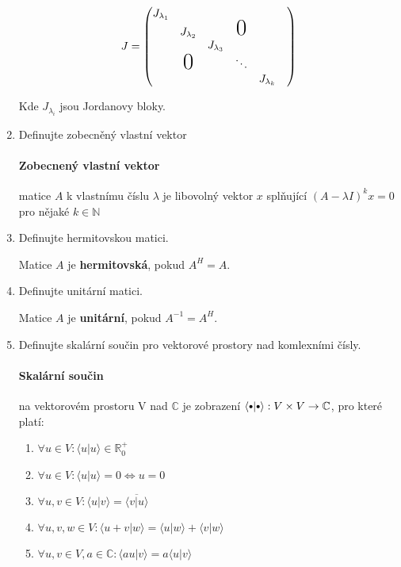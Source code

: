 \documentclass[10pt,a4paper]{article}
\newcommand\sbullet[1][.5]{\mathbin{\vcenter{\hbox{\scalebox{#1}{$\bullet$}}}}}
\theoremstyle{plain}
\begin{document}
\begin{enumerate}
\[ J = \begin{pmatrix}
J_{\lambda_1} && 	&&\\
& J_{\lambda_2} &&\mbox{\huge{0}} &\\
&& J_{\lambda_3}&&&\\
&\mbox{\huge{0}}&& \ddots & \\
& &	&& J_{\lambda_k}
\end{pmatrix}\]

Kde $J_{\lambda_i}$ jsou Jordanovy bloky.

\item Definujte zobecněný vlastní vektor

\paragraph{Zobecnený vlastní vektor} matice $A$ k vlastnímu číslu $\lambda$ je libovolný vektor $x$ splňující $(A-\lambda I)^kx = 0$ pro nějaké $k \in \mathbb{N}$ 

\item Definujte hermitovskou matici.

Matice $A$ je \textbf{hermitovská}, pokud $A^H = A$.

\item Definujte unitární matici.


Matice $A$ je \textbf{unitární}, pokud $A^{-1} = A^H$.


\item Definujte skalární součin pro vektorové prostory nad komlexními čísly.

\paragraph{Skalární součin} na vektorovém prostoru V nad $\mathbb{C}$ je zobrazení $\langle \sbullet[.75] | \sbullet[.75] \rangle : V \times V \to \mathbb{C}$, pro které platí:

\begin{enumerate}[label=(\roman*)]
\item $\forall u \in V:\langle u | u \rangle \in \mathbb{R}^+_0$
\item $\forall u \in V:\langle u | u \rangle = 0 \iff u = 0$
\item $\forall u,v \in V:\langle u | v \rangle = \overline{\langle v | u \rangle}$
\item $\forall u,v,w \in V:\langle u + v | w \rangle = \langle u | w \rangle  + \langle  v | w \rangle $
\item $\forall u,v \in V, a \in \mathbb{C}: \langle au | v \rangle = a \langle u | v \rangle $
\end{enumerate}



\end{enumerate}
\end{document}
